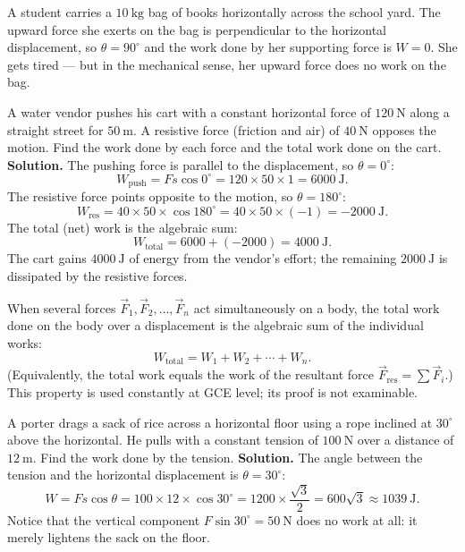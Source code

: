 \documentclass[11pt]{article}
\begin{document}
\begin{exemplebox}
A student carries a $10\ \mathrm{kg}$ bag of books horizontally across the school yard. The upward force she exerts on the bag is perpendicular to the horizontal displacement, so $\theta = 90^\circ$ and the work done by her supporting force is $W = 0$. She gets tired --- but in the mechanical sense, her upward force does no work on the bag.
\end{exemplebox}

\begin{exoresolu}
A water vendor pushes his cart with a constant horizontal force of $120\ \mathrm{N}$ along a straight street for $50\ \mathrm{m}$. A resistive force (friction and air) of $40\ \mathrm{N}$ opposes the motion. Find the work done by each force and the total work done on the cart.
\tcblower
\textbf{Solution.} The pushing force is parallel to the displacement, so $\theta = 0^\circ$:
\[
W_{\text{push}} = Fs\cos 0^\circ = 120 \times 50 \times 1 = 6000\ \mathrm{J}.
\]
The resistive force points opposite to the motion, so $\theta = 180^\circ$:
\[
W_{\text{res}} = 40 \times 50 \times \cos 180^\circ = 40 \times 50 \times (-1) = -2000\ \mathrm{J}.
\]
The total (net) work is the algebraic sum:
\[
W_{\text{total}} = 6000 + (-2000) = 4000\ \mathrm{J}.
\]
The cart gains $4000\ \mathrm{J}$ of energy from the vendor's effort; the remaining $2000\ \mathrm{J}$ is dissipated by the resistive forces.
\end{exoresolu}

\begin{propriete}
When several forces $\vec{F}_1, \vec{F}_2, \dots, \vec{F}_n$ act simultaneously on a body, the total work done on the body over a displacement is the algebraic sum of the individual works:
\[
W_{\text{total}} = W_1 + W_2 + \cdots + W_n.
\]
(Equivalently, the total work equals the work of the resultant force $\vec{F}_{\text{res}} = \sum \vec{F}_i$.) This property is used constantly at GCE level; its proof is not examinable.
\end{propriete}

\begin{exoresolu}
A porter drags a sack of rice across a horizontal floor using a rope inclined at $30^\circ$ above the horizontal. He pulls with a constant tension of $100\ \mathrm{N}$ over a distance of $12\ \mathrm{m}$. Find the work done by the tension.
\tcblower
\textbf{Solution.} The angle between the tension and the horizontal displacement is $\theta = 30^\circ$:
\[
W = Fs\cos\theta = 100 \times 12 \times \cos 30^\circ = 1200 \times \frac{\sqrt{3}}{2} = 600\sqrt{3} \approx 1039\ \mathrm{J}.
\]
Notice that the vertical component $F\sin 30^\circ = 50\ \mathrm{N}$ does no work at all: it merely lightens the sack on the floor.
\end{exoresolu}
\end{document}
